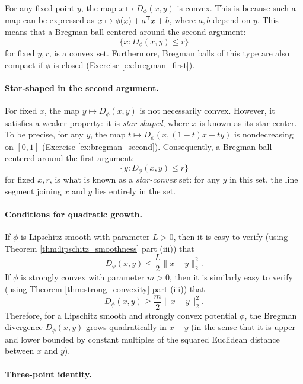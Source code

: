 For any fixed point $y$, the map $x \mapsto D_\phi(x,y)$ is convex. This is
because such a map can be expressed as $x \mapsto \phi(x) + a^{\mathsf{T}} x + b$, where
$a,b$ depend on $y$. This means that a Bregman ball centered around the second 
argument:
\[
\{ x : D_\phi(x,y) \leq r \}
\]
for fixed $y,r$, is a convex set. Furthermore, Bregman balls of this type are
also compact if $\phi$ is closed (Exercise \ref{ex:bregman_first}).     

\paragraph{Star-shaped in the second argument.} 

For fixed $x$, the map $y \mapsto D_\phi(x,y)$ is not necessarily
convex. However, it satisfies a weaker property: it is \emph{star-shaped}, where 
$x$ is known as its star-center. To be precise, for any $y$, the map $t \mapsto 
D_\phi(x, (1-t) x + ty)$ is nondecreasing on $[0,1]$ (Exercise
\ref{ex:bregman_second}). Consequently, a Bregman ball centered around the 
first argument:          
\[
\{ y : D_\phi(x,y) \leq r \}
\]
for fixed $x,r$, is what is known as a \emph{star-convex} set: for any $y$ in
this set, the line segment joining $x$ and $y$ lies entirely in the set. 

\paragraph{Conditions for quadratic growth.}

If $\phi$ is Lipschitz smooth with parameter $L>0$, then it is easy to verify
(using Theorem \ref{thm:lipschitz_smoothness} part (iii)) that 
\[
D_\phi(x,y) \leq \frac{L}{2} \|x-y\|_2^2.
\]
If $\phi$ is strongly convex with parameter $m>0$, then it is similarly easy to
verify (using Theorem \ref{thm:strong_convexity} part (iii)) that 
\[
D_\phi(x,y) \geq \frac{m}{2} \|x-y\|_2^2.
\]
Therefore, for a Lipschitz smooth and strongly convex potential $\phi$, the
Bregman divergence $D_\phi(x,y)$ grows quadratically in $x-y$ (in the sense that
it is upper and lower bounded by constant multiples of the squared Euclidean
distance between $x$ and $y$).

\paragraph{Three-point identity.}

